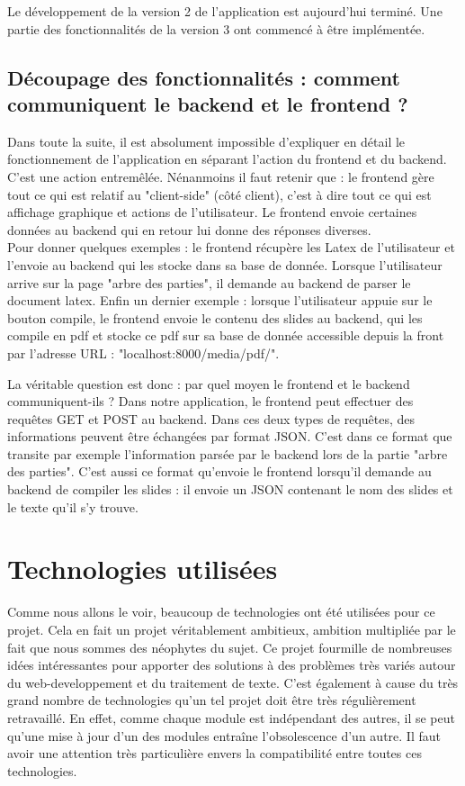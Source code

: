 \documentclass[12pt]{article}
\begin{document}
Le développement de la version 2 de l'application est aujourd'hui terminé. Une partie des fonctionnalités de la version 3 ont commencé à être implémentée.

\subsection{Découpage des fonctionnalités : comment communiquent le backend et le frontend ?}
\noindent
Dans toute la suite, il est absolument impossible d'expliquer en détail le fonctionnement de l'application en séparant l'action du frontend et du backend. C'est une action entremêlée. Nénanmoins il faut retenir que : le frontend gère tout ce qui est relatif au "client-side" (côté client), c'est à dire tout ce qui est affichage graphique et actions de l'utilisateur. Le frontend envoie certaines données au backend qui en retour lui donne des réponses diverses.\\
Pour donner quelques exemples : le frontend récupère les Latex de l'utilisateur et l'envoie au backend qui les stocke dans sa base de donnée. Lorsque l'utilisateur arrive sur la page "arbre des parties", il demande au backend de parser le document latex. Enfin un dernier exemple : lorsque l'utilisateur appuie sur le bouton compile, le frontend envoie le contenu des slides au backend, qui les compile en pdf et stocke ce pdf sur sa base de donnée accessible depuis la front par l'adresse URL : "localhost:8000/media/pdf/".

\noindent
La véritable question est donc : par quel moyen le frontend et le backend communiquent-ils ? 
Dans notre application, le frontend peut effectuer des requêtes GET et POST au backend. Dans ces deux types de requêtes, des informations peuvent être échangées par format JSON. C'est dans ce format que transite par exemple l'information parsée par le backend lors de la partie "arbre des parties". C'est aussi ce format qu'envoie le frontend lorsqu'il demande au backend de compiler les slides : il envoie un JSON contenant le nom des slides et le texte qu'il s'y trouve.

\section{Technologies utilisées}
Comme nous allons le voir, beaucoup de technologies ont été utilisées pour ce projet. Cela en fait un projet véritablement ambitieux, ambition multipliée par le fait que nous sommes des néophytes du sujet. Ce projet fourmille de nombreuses idées intéressantes pour apporter des solutions à des problèmes très variés autour du web-developpement et du traitement de texte. C'est également à cause du très grand nombre de technologies qu'un tel projet doit être très régulièrement retravaillé. En effet, comme chaque module est indépendant des autres, il se peut qu'une mise à jour d'un des modules entraîne l'obsolescence d'un autre. Il faut avoir une attention très particulière envers la compatibilité entre toutes ces technologies.
\end{document}
